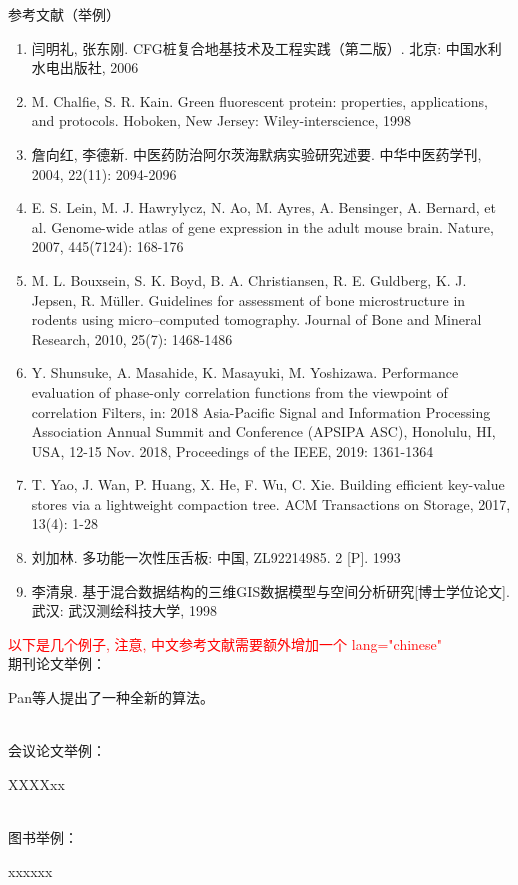 参考文献（举例）
\begin{enumerate}
\renewcommand{\labelenumi}{[\theenumi]}
\item	闫明礼, 张东刚. CFG桩复合地基技术及工程实践（第二版）. 北京: 中国水利水电出版社, 2006

\item	M. Chalfie, S. R. Kain. Green fluorescent protein: properties, applications, and protocols. Hoboken, New Jersey: Wiley-interscience, 1998

\item	詹向红, 李德新. 中医药防治阿尔茨海默病实验研究述要. 中华中医药学刊, 2004, 22(11): 2094-2096

\item	E. S. Lein, M. J. Hawrylycz, N. Ao, M. Ayres, A. Bensinger, A. Bernard, et al. Genome-wide atlas of gene expression in the adult mouse brain. Nature, 2007, 445(7124): 168-176

\item	M. L. Bouxsein, S. K. Boyd, B. A. Christiansen, R. E. Guldberg, K. J. Jepsen, R. Müller. Guidelines for assessment of bone microstructure in rodents using micro–computed tomography. Journal of Bone and Mineral Research, 2010, 25(7): 1468-1486

\item	Y. Shunsuke, A. Masahide, K. Masayuki, M. Yoshizawa. Performance evaluation of phase-only correlation functions from the viewpoint of correlation Filters, in: 2018 Asia-Pacific Signal and Information Processing Association Annual Summit and Conference (APSIPA ASC), Honolulu, HI, USA, 12-15 Nov. 2018, Proceedings of the IEEE, 2019: 1361-1364

\item	T. Yao, J. Wan, P. Huang, X. He, F. Wu, C. Xie. Building efficient key-value stores via a lightweight compaction tree. ACM Transactions on Storage, 2017, 13(4): 1-28

\item	刘加林. 多功能一次性压舌板: 中国, ZL92214985. 2 [P]. 1993

\item	李清泉. 基于混合数据结构的三维GIS数据模型与空间分析研究[博士学位论文]. 武汉: 武汉测绘科技大学, 1998

\end{enumerate}

\textcolor{red}{以下是几个例子, 注意, 中文参考文献需要额外增加一个 lang="chinese"}
~\\
期刊论文举例：

Pan等人提出了一种全新的算法\cite{pan2018classification, pan2014cell, song2013asynchronous, lin2022adaptive, liu2023low}。

~\\
会议论文举例：

XXXXxx\cite{li2021large}

~\\
图书举例：

xxxxxx\cite{shavlik1990readings, yan2006CFG}





